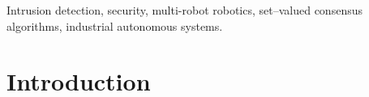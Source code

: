 \documentclass[journal, onecolumn, 12pt]{styles/IEEEtran}
\begin{document}
\begin{abstract}
\end{abstract}

\begin{IEEEkeywords}
Intrusion detection, security, multi-robot robotics, set--valued consensus algorithms, industrial autonomous systems.
\end{IEEEkeywords}

\IEEEpeerreviewmaketitle

\section{Introduction}
\end{document}
